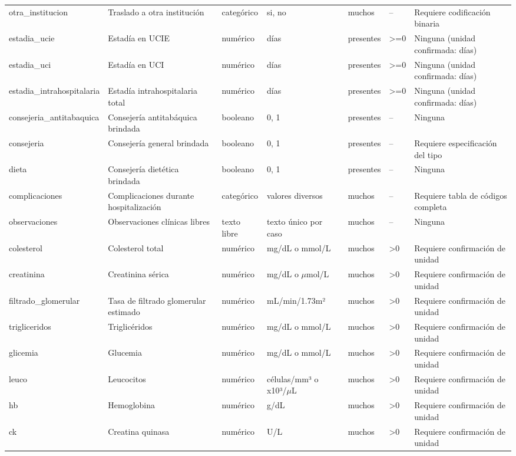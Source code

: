 \documentclass[11pt,a4paper]{article}
\begin{document}
\begin{longtable}{@{}L{0.095\textwidth} L{0.17\textwidth} L{0.07\textwidth} L{0.16\textwidth} L{0.14\textwidth} L{0.13\textwidth} L{0.15\textwidth}@{}}
otra\_institucion & Traslado a otra institución & categórico & si, no & muchos & -- & Requiere codificación binaria \\
estadia\_ucie & Estadía en UCIE & numérico & días & presentes & >=0 & Ninguna (unidad confirmada: días) \\
estadia\_uci & Estadía en UCI & numérico & días & presentes & >=0 & Ninguna (unidad confirmada: días) \\
estadia\_intrahospitalaria & Estadía intrahospitalaria total & numérico & días & presentes & >=0 & Ninguna (unidad confirmada: días) \\
consejeria\_antitabaquica & Consejería antitabáquica brindada & booleano & 0, 1 & presentes & -- & Ninguna \\
consejeria & Consejería general brindada & booleano & 0, 1 & presentes & -- & Requiere especificación del tipo \\
dieta & Consejería dietética brindada & booleano & 0, 1 & presentes & -- & Ninguna \\
complicaciones & Complicaciones durante hospitalización & categórico & valores diversos & muchos & -- & Requiere tabla de códigos completa \\
observaciones & Observaciones clínicas libres & texto libre & texto único por caso & muchos & -- & Ninguna \\
colesterol & Colesterol total & numérico & mg/dL o mmol/L & muchos & >0 & Requiere confirmación de unidad \\
creatinina & Creatinina sérica & numérico & mg/dL o $\mu$mol/L & muchos & >0 & Requiere confirmación de unidad \\
filtrado\_glomerular & Tasa de filtrado glomerular estimado & numérico & mL/min/1.73m² & muchos & >0 & Requiere confirmación de unidad \\
trigliceridos & Triglicéridos & numérico & mg/dL o mmol/L & muchos & >0 & Requiere confirmación de unidad \\
glicemia & Glucemia & numérico & mg/dL o mmol/L & muchos & >0 & Requiere confirmación de unidad \\
leuco & Leucocitos & numérico & células/mm³ o x10³/$\mu$L & muchos & >0 & Requiere confirmación de unidad \\
hb & Hemoglobina & numérico & g/dL & muchos & >0 & Requiere confirmación de unidad \\
ck & Creatina quinasa & numérico & U/L & muchos & >0 & Requiere confirmación de unidad \\

\end{longtable}
\end{document}
